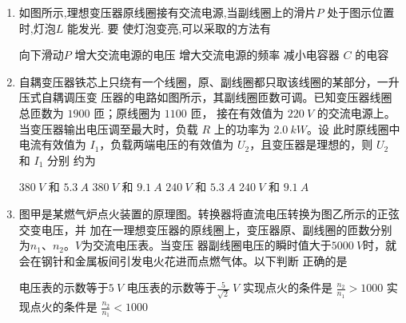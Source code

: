 \begin{enumerate}
\item 
{}
如图所示,理想变压器原线圈接有交流电源,当副线圈上的滑片$ P $ 处于图示位置时,灯泡$ L $ 能发光. 要
使灯泡变亮,可以采取的方法有  
\begin{figure}[h!]
\centering

\end{figure}

\fourchoices
{向下滑动$ P $}
{增大交流电源的电压}
{增大交流电源的频率}
{减小电容器 $ C $ 的电容}


\item 
{}
自耦变压器铁芯上只绕有一个线圈，原、副线圈都只取该线圈的某部分，一升压式自耦调压变
压器的电路如图所示，其副线圈匝数可调。已知变压器线圈总匝数为 $ 1900 $ 匝；原线圈为 $ 1100 $ 匝，
接在有效值为 $ 220 \ V $ 的交流电源上。当变压器输出电压调至最大时，负载 $ R $ 上的功率为 $ 2.0 \ kW $。设
此时原线圈中电流有效值为 $ I_{1} $，负载两端电压的有效值为 $ U_{2} $，且变压器是理想的，则 $ U_{2} $ 和 $ I_{1} $ 分别
约为  
\begin{figure}[h!]
\centering

\end{figure}


\fourchoices
{$ 380 \ V $ 和 $ 5.3 \ A $}
{$ 380 \ V $ 和 $ 9.1 \ A $}
{$ 240 \ V $ 和 $ 5.3 \ A $}
{$ 240 \ V $ 和 $ 9.1 \ A $}


\item 
{}
图甲是某燃气炉点火装置的原理图。转换器将直流电压转换为图乙所示的正弦交变电压，并
加在一理想变压器的原线圈上，变压器原、副线圈的匝数分别为$ n_{1} $、$ n_{2} $。$ V $为交流电压表。当变压
器副线圈电压的瞬时值大于$ 5000 \ V $时，就会在钢针和金属板间引发电火花进而点燃气体。以下判断
正确的是  
\begin{figure}[h!]
\centering
\begin{subfigure}{0.4\linewidth}
\centering
 
\caption{}\label{}
\end{subfigure}
\begin{subfigure}{0.4\linewidth}
\centering
 
\caption{}\label{}
\end{subfigure}
\end{figure}



\fourchoices
{电压表的示数等于$ 5 \ V $}
{电压表的示数等于$\frac{5}{\sqrt{2}} \ V$}
{实现点火的条件是 $\frac{n_{2}}{n_{1}}>1000$}
{实现点火的条件是 $\frac{n_{2}}{n_{1}}<1000$}



\end{enumerate}
